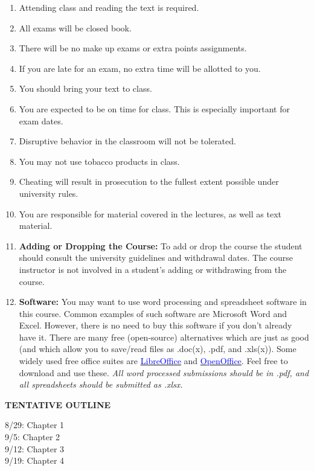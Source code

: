 \documentclass{article}
\begin{document}
\begin{enumerate}
\item Attending class and reading the text is required.
\item All exams will be closed book.
\item There will be no make up exams or extra points assignments.
\item If you are late for an exam, no extra time will be allotted to you.
\item You should bring your text to class.
\item You are expected to be on time for class. This is especially important for exam
dates.
\item Disruptive behavior in the classroom will not be tolerated.
\item You may not use tobacco products in class.
\item Cheating will result in prosecution to the fullest extent possible under university rules.
\item You are responsible for material covered in the lectures, as well as text material.
\item  {\bf Adding or Dropping the Course:} To add or drop the course the student should consult the university guidelines and withdrawal dates.
The course instructor is not involved in a student's adding or withdrawing from the course.
\item {\bf Software:} You may want to use word processing and spreadsheet software in
this course. Common examples of such software are Microsoft Word and
Excel. However, there is no need to buy this software if you don't already
have it. There are many free (open-source) alternatives which are just as
good (and which allow you to save/read files as .doc(x), .pdf, and .xls(x)).
Some widely used free office suites are \href{http://www.libreoffice.org}{\textcolor{blue}{LibreOffice}}
and  \href{http://www.openoffice.org}{\textcolor{blue}{OpenOffice}}. Feel free to download and use
these. {\it All word processed submissions should be in .pdf, and
all spreadsheets should be submitted as .xlsx.}
\end{enumerate}
\vspace*{5pt}
\begin{center}
{\bf TENTATIVE OUTLINE}
\end{center}
8/29:  Chapter 1 \\
9/5:  Chapter 2\\
9/12: Chapter 3\\
9/19: Chapter 4 \\
\end{document}
